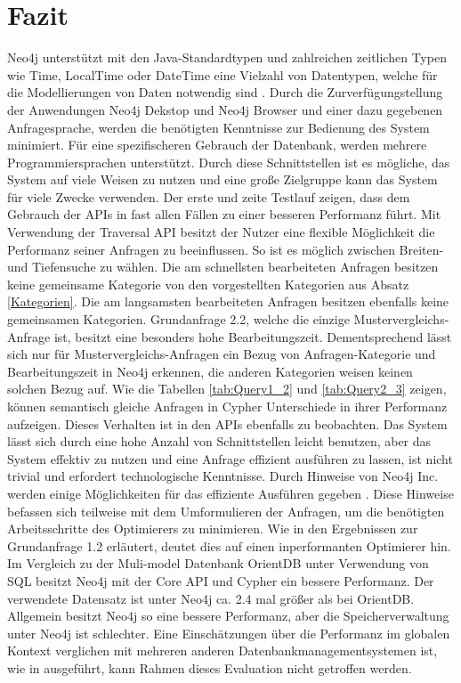 \section{Fazit}
Neo4j unterstützt mit den Java-Standardtypen und zahlreichen zeitlichen Typen wie Time, LocalTime oder DateTime eine Vielzahl von Datentypen, welche für die Modellierungen von Daten notwendig sind \parencite{Types}. Durch die Zurverfügungstellung der Anwendungen Neo4j Dekstop und Neo4j Browser und einer dazu gegebenen Anfragesprache, werden die benötigten Kenntnisse zur Bedienung des System minimiert. Für eine spezifischeren Gebrauch der Datenbank, werden mehrere Programmiersprachen unterstützt. Durch diese Schnittstellen ist es mögliche, das System auf viele Weisen zu nutzen und eine große Zielgruppe kann das System für viele Zwecke verwenden. \newline 
Der erste und zeite Testlauf zeigen, dass dem Gebrauch der APIs in fast allen Fällen zu einer besseren Performanz führt. Mit Verwendung der Traversal API besitzt der Nutzer eine flexible Möglichkeit die Performanz seiner Anfragen zu beeinflussen. So ist es möglich zwischen Breiten- und Tiefensuche zu wählen. Die am schnellsten bearbeiteten Anfragen besitzen keine gemeinsame Kategorie von den vorgestellten Kategorien aus Absatz \ref{Kategorien}. Die am langsamsten bearbeiteten Anfragen besitzen ebenfalls keine gemeinsamen Kategorien. Grundanfrage 2.2, welche die einzige Mustervergleichs-Anfrage ist, besitzt eine besonders hohe Bearbeitungszeit. Dementsprechend lässt sich nur für Mustervergleichs-Anfragen ein Bezug von Anfragen-Kategorie und Bearbeitungszeit in Neo4j erkennen, die anderen Kategorien weisen keinen solchen Bezug auf. \newline
Wie die Tabellen \ref{tab:Query1_2} und \ref{tab:Query2_3} zeigen, können semantisch gleiche Anfragen in Cypher Unterschiede in ihrer Performanz aufzeigen. Dieses Verhalten ist in den APIs ebenfalls zu beobachten. Das System lässt sich durch eine hohe Anzahl von Schnittstellen leicht benutzen, aber das System effektiv zu nutzen und eine Anfrage effizient ausführen zu lassen, ist nicht trivial und erfordert technologische Kenntnisse. Durch Hinweise von Neo4j Inc. werden einige Möglichkeiten für das effiziente Ausführen gegeben \parencite{Optimizer}. Diese Hinweise befassen sich teilweise mit dem Umformulieren der Anfragen, um die benötigten Arbeitsschritte des Optimierers zu minimieren. Wie in den Ergebnissen zur Grundanfrage 1.2 erläutert, deutet dies auf einen inperformanten Optimierer hin. \newline
Im Vergleich zu der Muli-model Datenbank OrientDB unter Verwendung von SQL besitzt Neo4j mit der Core API und Cypher ein bessere Performanz. Der verwendete Datensatz ist unter Neo4j ca. 2.4 mal größer als bei OrientDB. Allgemein besitzt Neo4j so eine bessere Performanz, aber die Speicherverwaltung unter Neo4j ist schlechter. Eine Einschätzungen über die Performanz im globalen Kontext verglichen mit mehreren anderen Datenbankmanagementsystemen ist, wie in \parencite{jouili2013empirical} ausgeführt, kann Rahmen dieses Evaluation nicht getroffen werden. 

